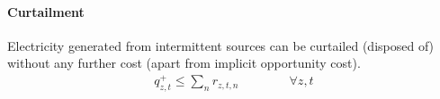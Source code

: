 \documentclass[11pt,a4paper]{article}
\begin{document}
\paragraph{Curtailment}
Electricity generated from intermittent sources can be curtailed (disposed of) without any further cost (apart from implicit opportunity cost). 
\begin{align}
q^{+}_{z,t} \leq \sum_{n} r_{z,t,n} \qquad \qquad \forall z, t
\end{align}
\end{document}
